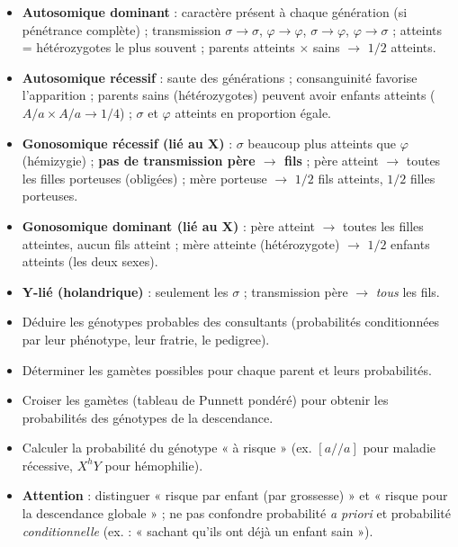 \documentclass[11pt]{article}
\begin{document}
\begin{methode}
\begin{itemize}
    \item \textbf{Autosomique dominant} : caractère présent à chaque génération (si pénétrance complète) ; transmission $\sigma \rightarrow \sigma$, $\varphi \rightarrow \varphi$, $\sigma \rightarrow \varphi$, $\varphi \rightarrow \sigma$ ; atteints = hétérozygotes le plus souvent ; parents atteints $\times$ sains $\rightarrow$ $1/2$ atteints.
    \item \textbf{Autosomique récessif} : saute des générations ; consanguinité favorise l'apparition ; parents sains (hétérozygotes) peuvent avoir enfants atteints ($A/a \times A/a \rightarrow 1/4$) ; $\sigma$ et $\varphi$ atteints en proportion égale.
    \item \textbf{Gonosomique récessif (lié au X)} : $\sigma$ beaucoup plus atteints que $\varphi$ (hémizygie) ; \textbf{pas de transmission père $\rightarrow$ fils} ; père atteint $\rightarrow$ toutes les filles porteuses (obligées) ; mère porteuse $\rightarrow$ $1/2$ fils atteints, $1/2$ filles porteuses.
    \item \textbf{Gonosomique dominant (lié au X)} : père atteint $\rightarrow$ toutes les filles atteintes, aucun fils atteint ; mère atteinte (hétérozygote) $\rightarrow$ $1/2$ enfants atteints (les deux sexes).
    \item \textbf{Y-lié (holandrique)} : seulement les $\sigma$ ; transmission père $\rightarrow$ \emph{tous} les fils.
\end{itemize}
\end{methode}

\begin{methode}
\begin{itemize}
    \item Déduire les génotypes probables des consultants (probabilités conditionnées par leur phénotype, leur fratrie, le pedigree).
    \item Déterminer les gamètes possibles pour chaque parent et leurs probabilités.
    \item Croiser les gamètes (tableau de Punnett pondéré) pour obtenir les probabilités des génotypes de la descendance.
    \item Calculer la probabilité du génotype « à risque » (ex. $[a//a]$ pour maladie récessive, $X^{h}Y$ pour hémophilie).
    \item \textbf{Attention} : distinguer « risque par enfant (par grossesse) » et « risque pour la descendance globale » ; ne pas confondre probabilité \emph{a priori} et probabilité \emph{conditionnelle} (ex. : « sachant qu'ils ont déjà un enfant sain »).
\end{itemize}
\end{methode}
\end{document}
